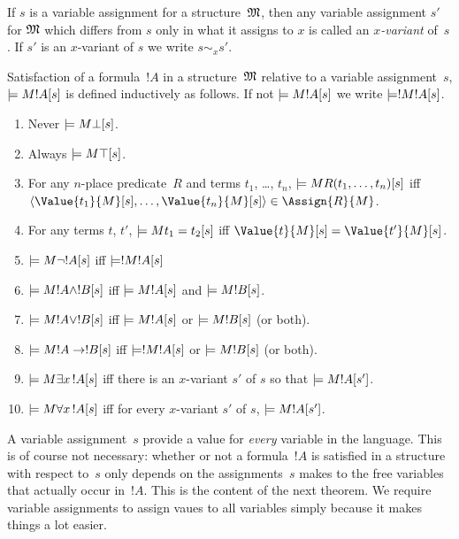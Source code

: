 \documentclass[syntax-and-semantics]{subfiles}
\begin{document}
\begin{defn}[$x$-Variant]
If $s$ is a variable assignment for a structure~$\mathfrak M$, then any
variable assignment $s'$ for $\mathfrak M$ which differs from $s$ only
in what it assigns to $x$ is called an \emph{$x$-variant} of~$s$.  If
$s'$ is an $x$-variant of $s$ we write $s \sim_x s'$.
\end{defn}

\begin{defn}[Satisfaction]
Satisfaction of a formula~$!A$ in a structure~$\mathfrak M$ relative to
a variable assignment~$s$, $\models{M}{!A}[s]$ is defined inductively as
follows. If not $\models{M}{!A}[s]$ we write $\models!{M}{!A}[s]$.
\begin{enumerate}
\item Never $\models{M}{\bot}[s]$.
\item Always $\models{M}{\top}[s]$.
\item For any $n$-place predicate~$R$ and terms $t_1$, \dots, $t_n$,
  $\models{M}{ { R(t_1, \dots, t_n) } }[s]$ iff $\langle \Value{t_1}{M}[s],
  \dots, \Value{t_n}{M}[s] \rangle \in \Assign{R}{M}$.
\item For any terms $t$, $t'$, $\models{M}{t_1 = t_2}[s]$ iff
  $\Value{t}{M}[s] = \Value{t'}{M}[s]$.
\item $\models{M}{\lnot !A}[s]$ iff $\models!{M}{!A}[s]$
\item $\models{M}{!A \land !B}[s]$ iff $\models{M}{!A}[s]$ and $\models{M}{!B}[s]$.
\item $\models{M}{!A \lor !B}[s]$ iff $\models{M}{!A}[s]$ or
  $\models{M}{!B}[s]$ (or both).
\item $\models{M}{!A \to!B}[s]$ iff $\models!{M}{!A}[s]$ or
  $\models{M}{!B}[s]$ (or both).
\item $\Sat{M}{\lexists[x][!A]}[s]$ iff there is an $x$-variant $s'$
  of $s$ so that $\models{M}{!A}[s']$.
\item $\Sat{M}{\lforall[x][!A]}[s]$ iff for every $x$-variant $s'$ of
  $s$, $\models{M}{!A}[s']$.
\end{enumerate}
\end{defn}

\begin{wordy}
A variable assignment~$s$ provide a value for \emph{every} variable in
the language. This is of course not necessary: whether or not a
formula~$!A$ is satisfied in a structure with respect to~$s$ only
depends on the assignments~$s$ makes to the free variables that
actually occur in~$!A$.  This is the content of the next theorem.  We
require variable assignments to assign vaues to all variables simply
because it makes things a lot easier.
\end{wordy}
\end{document}
